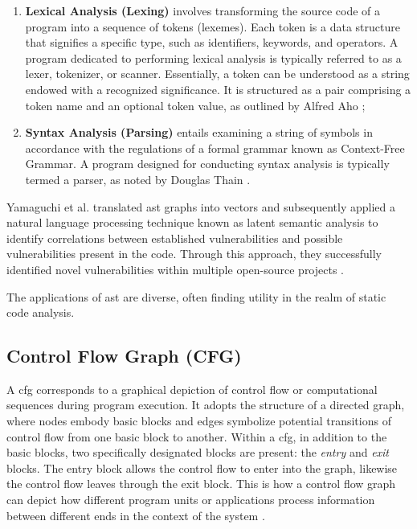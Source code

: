 \begin{enumerate}
\item \textbf{Lexical Analysis (Lexing)} involves transforming the source code of a program into a sequence of tokens (lexemes). Each token is a data structure that signifies a specific type, such as identifiers, keywords, and operators. A program dedicated to performing lexical analysis is typically referred to as a lexer, tokenizer, or scanner. Essentially, a token can be understood as a string endowed with a recognized significance. It is structured as a pair comprising a token name and an optional token value, as outlined by Alfred Aho \cite{Alfred_V2007};
\item \textbf{Syntax Analysis (Parsing)} entails examining a string of symbols in accordance with the regulations of a formal grammar known as Context-Free Grammar. A program designed for conducting syntax analysis is typically termed a parser, as noted by Douglas Thain \cite{Douglas_Thain}. 
\end{enumerate}

Yamaguchi et al. \cite{Fabian_Markus_Konrad2023} translated \gls{ast} graphs into vectors and subsequently applied a natural language processing technique known as latent semantic analysis to identify correlations between established vulnerabilities and possible vulnerabilities present in the code. Through this approach, they successfully identified novel vulnerabilities within multiple open-source projects \cite{Fabian_Markus_Konrad2023}.

The applications of \gls{ast} are diverse, often finding utility in the realm of static code analysis.


\subsection{Control Flow Graph (CFG)} %
\label{sec: Control_Flow_Graph}

A \gls{cfg} corresponds to a graphical depiction of control flow or computational sequences during program execution. It adopts the structure of a directed graph, where nodes embody basic blocks and edges symbolize potential transitions of control flow from one basic block to another. Within a \gls{cfg}, in addition to the basic blocks, two specifically designated blocks are present: the \textit{entry} and \textit{exit} blocks. The entry block allows the control flow to enter into the graph, likewise the control flow leaves through the exit block. This is how a control flow graph can depict how different program units or applications process information between different ends in the context of the system \cite{Kronjee2018}.

